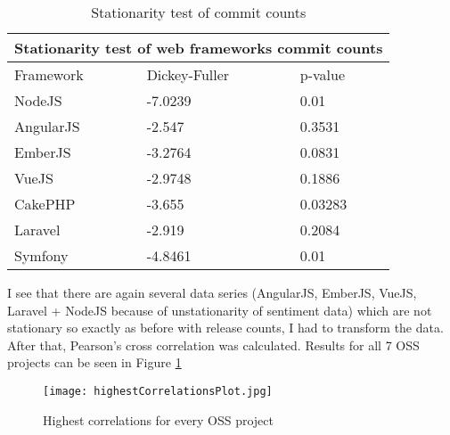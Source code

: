 \begin{table}[H]
\centering
\begin{tabular}{ |p{3cm}||p{3cm}|p{3cm}|  }
 \hline
 \multicolumn{3}{|c|}{Stationarity test of web frameworks commit counts} \\
 \hline
 Framework & Dickey-Fuller & p-value\\
 \hline
 NodeJS   & -7.0239    &0.01\\ \hline
 AngularJS &   -2.547  & 0.3531\\ \hline
 EmberJS & -3.2764 & 0.0831\\ \hline
 VueJS    &-2.9748 & 0.1886\\ \hline
 CakePHP&   -3.655  & 0.03283\\ \hline
 Laravel& -2.919  & 0.2084\\ \hline
 Symfony& -4.8461  & 0.01\\ \hline
\end{tabular}
\caption{Stationarity test of commit counts}
\label{table:stationarity_table_commits}
\end{table}

I see that there are again several data series (AngularJS, EmberJS, VueJS, Laravel + NodeJS because of unstationarity of sentiment data) which are not stationary so exactly as before with release counts, I had to transform the data. After that, Pearson's cross correlation was calculated. Results for all 7 OSS projects can be seen in Figure \ref{fig:highestCorrelationsPlot}

\begin{figure}[H]%
    \centering
	\texttt{[image: highestCorrelationsPlot.jpg]}
    \caption{Highest correlations for every OSS project}%
    \label{fig:highestCorrelationsPlot}%
\end{figure}